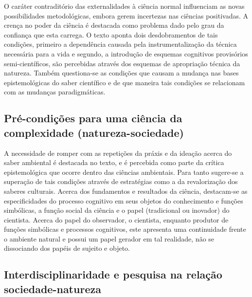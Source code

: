 \documentclass[
   article,       %
   12pt,          %
   oneside,       %
   a4paper,       %
   english,       %
   brazil,           %
   sumario=tradicional
   ]{abntex2}
\begin{document}
O caráter contraditório das externalidades à ciência normal influenciam as novas possibilidades metodológicas, embora gerem incertezas nas ciências positivadas. A crença no poder da ciência é destacada como problema dado pelo grau da confiança que esta carrega. O texto aponta dois desdobramentos de tais condições, primeiro a dependência causada pela instrumentalização da técnica necessária para a vida e segundo, a introdução de esquemas cognitivos provisórios semi-científicos, são percebidas através dos esquemas de apropriação técnica da natureza. Também questiona-se as condições que causam a mudança nas bases epistemológicas do saber científico e de que maneira tais condições se relacionam com as mudanças paradigmáticas.


\subsection{Pré-condições para uma ciência da complexidade (natureza-sociedade)}

A necessidade de romper com as repetições da práxis e da ideação acerca do saber ambiental é destacada no texto, e é percebida como parte da crítica epistemológica que ocorre dentro das ciências ambientais. Para tanto sugere-se a superação de tais condições através de estratégias como a da revalorização dos saberes culturais. Acerca dos fundamentos e resultados da ciência, destacam-se as especificidades do processo cognitivo em seus objetos do conhecimento e funções simbólicas, a função social da ciência e o papel (tradicional ou inovador) do cientista. Acerca do papel do observador, o cientista, enquanto produtor de funções simbólicas e processos cognitivos, este apresenta uma continuidade frente o ambiente natural e possui um papel gerador em tal realidade, não se dissociando dos papéis de sujeito e objeto.



\subsection{Interdisciplinaridade e pesquisa na relação sociedade-natureza}
\end{document}
